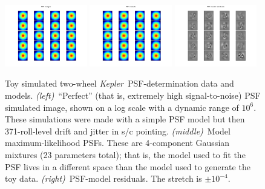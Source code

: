 \documentclass[letterpaper,12pt,whitepaper]{haastex}
\newcommand{\observatory}[1]{\textsl{#1}}
\newcommand{\Kepler}{\observatory{Kepler}}
\begin{document}
\begin{figure}
\includegraphics[trim=0.5in 0.5in 0.5in 0.5in, width=0.32\textwidth]{sim-100.png}%
\includegraphics[trim=0.5in 0.5in 0.5in 0.5in, width=0.32\textwidth]{sim-101.png}%
\includegraphics[trim=0.5in 0.5in 0.5in 0.5in, width=0.32\textwidth]{sim-102.png}
\caption{Toy simulated two-wheel \Kepler\ PSF-determination data and models.
\textsl{(left)}~``Perfect'' (that is, extremely high signal-to-noise) PSF simulated image, shown on a log scale with a dynamic range of $10^6$.  These simulations were made with a simple PSF model but then 371-roll-level drift and jitter in s/c pointing.
\textsl{(middle)}~Model maximum-likelihood PSFs.  These are 4-component Gaussian mixtures (23 parameters total); that is, the model used to fit the PSF lives in a different space than the model used to generate the toy data.
\textsl{(right)}~PSF-model residuals.  The stretch is $\pm 10^{-4}$.\label{fig:toypsf}}
\end{figure}
\end{document}
